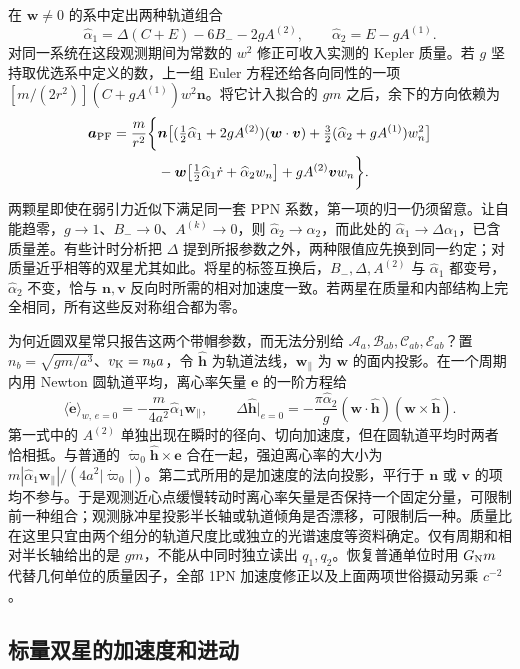 在 $\bm w\ne0$ 的系中定出两种轨道组合
\[
 \widehat\alpha_1=\Delta(C+E)-6B_- -2gA^{(2)},\qquad
 \widehat\alpha_2=E-gA^{(1)} .
\]
对同一系统在这段观测期间为常数的 $w^2$ 修正可收入实测的 Kepler 质量。若 $g$ 坚持取优选系中定义的数，上一组 Euler 方程还给各向同性的一项 $[m/(2r^2)](C+gA^{(1)})w^2\bm n$。将它计入拟合的 $gm$ 之后，余下的方向依赖为
\begin{align*}
 \bm a_{\rm PF}=\frac{m}{r^2}\bigg\{&
 \bm n\big[(\tfrac12\widehat\alpha_1+2gA^{(2)})(\bm w\cdot\bm v)
       +\tfrac32(\widehat\alpha_2+gA^{(1)})w_n^2\big]\\
 &-\bm w\big[\tfrac12\widehat\alpha_1\dot r+\widehat\alpha_2 w_n\big]
       +gA^{(2)}\bm v w_n\bigg\}.
\end{align*}
两颗星即使在弱引力近似下满足同一套 PPN 系数，第一项的归一仍须留意。让自能趋零，$g\to1$、$B_-\to0$、$A^{(k)}\to0$，则 $\widehat\alpha_2\to\alpha_2$，而此处的 $\widehat\alpha_1\to\Delta\alpha_1$，已含质量差。有些计时分析把 $\Delta$ 提到所报参数之外，两种限值应先换到同一约定；对质量近乎相等的双星尤其如此。将星的标签互换后，$B_-,\Delta,A^{(2)}$ 与 $\widehat\alpha_1$ 都变号，$\widehat\alpha_2$ 不变，恰与 $\bm n,\bm v$ 反向时所需的相对加速度一致。若两星在质量和内部结构上完全相同，所有这些反对称组合都为零。

为何近圆双星常只报告这两个带帽参数，而无法分别给 $\mathcal A_a,\mathcal B_{ab},\mathcal C_{ab},\mathcal E_{ab}$？置 $n_b=\sqrt{gm/a^3}$、$v_{\rm K}=n_ba$，令 $\hat{\bm h}$ 为轨道法线，$\bm w_\parallel$ 为 $\bm w$ 的面内投影。在一个周期内用 Newton 圆轨道平均，离心率矢量 $\bm e$ 的一阶方程给
\[
 \langle\dot{\bm e}\rangle_{w,\,e=0}
    =-\frac{m}{4a^2}\widehat\alpha_1\bm w_\parallel,\qquad
 \Delta\hat{\bm h}\big|_{e=0}
    =-\frac{\pi\widehat\alpha_2}{g}
      (\bm w\cdot\hat{\bm h})(\bm w\times\hat{\bm h}).
\]
第一式中的 $A^{(2)}$ 单独出现在瞬时的径向、切向加速度，但在圆轨道平均时两者恰相抵。与普通的 $\dot\varpi_0\hat{\bm h}\times\bm e$ 合在一起，强迫离心率的大小为 $m|\widehat\alpha_1\bm w_\parallel|/(4a^2|\dot\varpi_0|)$。第二式所用的是加速度的法向投影，平行于 $\bm n$ 或 $\bm v$ 的项均不参与。于是观测近心点缓慢转动时离心率矢量是否保持一个固定分量，可限制前一种组合；观测脉冲星投影半长轴或轨道倾角是否漂移，可限制后一种。质量比在这里只宜由两个组分的轨道尺度比或独立的光谱速度等资料确定。仅有周期和相对半长轴给出的是 $gm$，不能从中同时独立读出 $q_1,q_2$。恢复普通单位时用 $G_{\rm N}m$ 代替几何单位的质量因子，全部 1PN 加速度修正以及上面两项世俗摄动另乘 $c^{-2}$。

\subsection{标量双星的加速度和进动}


